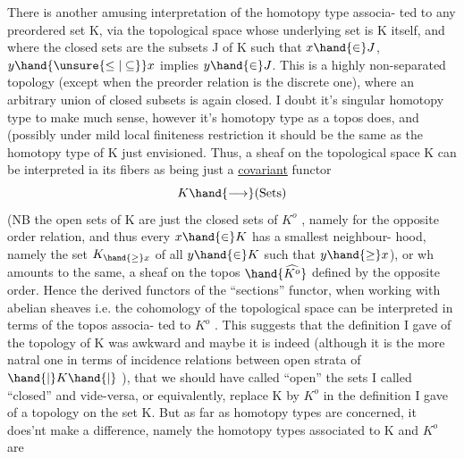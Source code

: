 
There is another amusing interpretation of the homotopy type associa-%
ted to any preordered set K,  via the topological space whose underlying
\margin{$\times$} set is K itself,  and where the closed sets are the subsets J of K
such that  $x \hand{\in} J$,  $y \hand{\unsure{\leq|\subseteq}} x$ implies $y \hand{\in} J$.  This is a highly non-separated
topology (except when the preorder relation is the discrete one),  where
an arbitrary union of closed subsets is again closed.  I doubt it's
singular homotopy type to make much sense,  however it's  homotopy type
as a topos does,  and (possibly under mild loc\unsure{\hand{-}}al finiteness restriction\hand{)}
it should be the same as the homotopy type of K just envisioned.  Thus,
a sheaf on the topological space K   can be interpreted 
ia its fibers as being just a \uline{covariant} functor
\[ K \hand{\longrightarrow} (\text{Sets}) \]
(NB  the open sets of K are just the closed sets of $K^{o}$ , namely for the
opposite order relation,  and thus every $x \hand{\in} K$ has a smallest neighbour-%
hood,  namely the set  $K_{\hand{\geq} x}$  of all $y \hand{\in} K$ such that $y \hand{\geq} x$),  or wh
amounts to the same,  a sheaf on the topos  $\hand{\widehat{K^{o}}}$  defined by the opposite
order.  Hence the derived functors of the ``sections'' functor,  when
working with abelian sheaves  i.e.  the cohomology of the
topological space can be interpreted in terms of the topos associa-%
ted to $K^{o}$ .  This suggests that the definition I gave of the topology
of K was awkward and maybe it is indeed (although it is the more natral
one in terms of incidence relations between open strata of $\hand{|}K\hand{|}$ ), that
we should have called ``open'' the sets I called ``closed'' and vide-versa,
or equivalently,  replace K by $K^{o}$ in the definition I gave of a topology
on the set K.  But as far as homotopy types are concerned, it does'nt
make a difference,  namely the homotopy types associated to K and $K^{o}$ are
